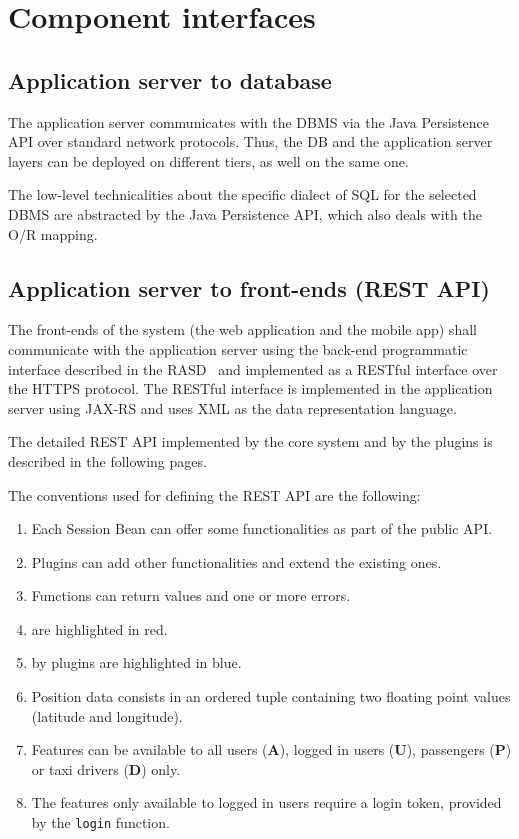 \section{Component interfaces}
\label{sec:component-interfaces}

\subsection{Application server to database}
The application server communicates with the DBMS via the Java Persistence API over standard network protocols. Thus, the DB and the application server layers can be deployed on different tiers, as well on the same one.

The low-level technicalities about the specific dialect of SQL for the selected DBMS are abstracted by the Java Persistence API, which also deals with the O/R mapping.

\subsection{Application server to front-ends (REST API)}
\label{sec:rest-api}
The front-ends of the system (the web application and the mobile app) shall communicate with the application server using the back-end programmatic interface described in the RASD~\cite{rasd} and implemented as a RESTful interface over the HTTPS protocol.
The RESTful interface is implemented in the application server using JAX-RS and uses XML as the data representation language.

The detailed REST API implemented by the core system and by the plugins is described in the following pages.

The conventions used for defining the REST API are the following:
\begin{enumerate}
    \item Each Session Bean can offer some functionalities as part of the public API.
    \item Plugins can add other functionalities and extend the existing ones.
    \item Functions can return values and one or more errors.
    \item {} are highlighted in red.
    \item {} by plugins are highlighted in blue.
    \item Position data consists in an ordered tuple containing two floating point values (latitude and longitude).
    \item Features can be available to all users (\textbf{A}), logged in users (\textbf{U}), passengers (\textbf{P}) or taxi drivers (\textbf{D}) only.
    \item The features only available to logged in users require a login token, provided by the \texttt{login} function.
\end{enumerate}

